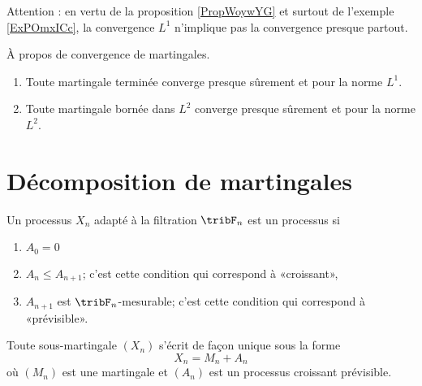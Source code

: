Attention : en vertu de la proposition \ref{PropWoywYG} et surtout de l'exemple \ref{ExPOmxICc}, la convergence \( L^1\) n'implique pas la convergence presque partout.

\begin{theorem}   \label{ThoHBvnTRk}
    À propos de convergence de martingales.
    \begin{enumerate}
        \item
            Toute martingale terminée converge presque sûrement et pour la norme \( L^1\).
        \item
            Toute martingale bornée dans \( L^2\) converge presque sûrement et pour la norme \( L^2\).
    \end{enumerate}
\end{theorem}

\section{Décomposition de martingales}

\begin{definition}
    Un processus \( X_n\) adapté à la filtration \( \tribF_n\) est un processus  si
    \begin{enumerate}
        \item
            \( A_0=0\)
        \item
            \( A_n\leq A_{n+1}\); c'est cette condition qui correspond à «croissant»,
        \item
            \( A_{n+1}\) est \( \tribF_n\)-mesurable; c'est cette condition qui correspond à «prévisible».
    \end{enumerate}
\end{definition}

\begin{proposition}
    Toute sous-martingale \( (X_n)\) s'écrit de façon unique sous la forme 
    \begin{equation}\label{EqCCsAwbZ}
        X_n=M_n+A_n 
    \end{equation}
    où \( (M_n)\) est une martingale et \( (A_n)\) est un processus croissant prévisible.
\end{proposition}

